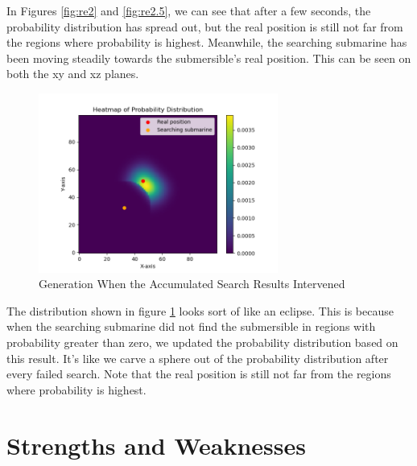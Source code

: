 \documentclass[12pt]{article}
\begin{document}
In Figures \ref{fig:re2} and \ref{fig:re2.5}, we can see that after a few seconds, the probability distribution has spread out, but the real position is still not far from the regions where probability is highest. Meanwhile, the searching submarine has been moving steadily towards the submersible's real position. This can be seen on both the xy and xz planes.


\begin{figure}[H]
\centering
\includegraphics[width=0.7\textwidth]{ecipse.png}
\caption{Generation When the Accumulated Search Results Intervened}
\label{fig:re5}
\end{figure}

The distribution shown in figure \ref{fig:re5} looks sort of like an eclipse. This is because when the searching submarine did not find the submersible in regions with probability greater than zero, we updated the probability distribution based on this result. It's like we carve a sphere out of the probability distribution after every failed search. Note that the real position is still not far from the regions where probability is highest.

\section{Strengths and Weaknesses}
\end{document}
